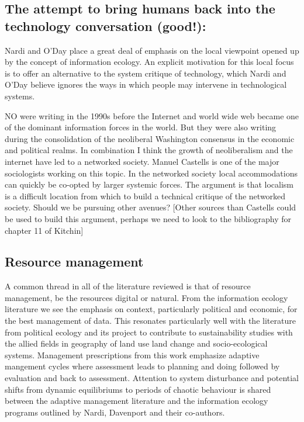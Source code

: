 \subsection{The attempt to bring humans back into the technology conversation (good!):}

Nardi and O'Day place a great deal of emphasis on the local viewpoint opened up by the concept of information ecology. An explicit motivation for this local focus is to offer an alternative to the system critique of technology, which Nardi and O'Day believe ignores the ways in which people may intervene in technological systems.

NO were writing in the 1990s before the Internet and world wide web became one of the dominant information forces in the world. But they were also writing during the consolidation of the neoliberal Washington consensus in the economic and political realms. In combination I think the growth of neoliberalism and the internet have led to a networked society. Manuel Castells is one of the major sociologists working on this topic. In the networked society local accommodations can quickly be co-opted by larger systemic forces. The argument is that localism is a difficult location from which to build a technical critique of the networked society. Should we be pursuing other avenues? [Other sources than Castells could be used to build this argument, perhaps we need to look to the bibliography for chapter 11 of Kitchin]

\subsection{Resource management}

A common thread in all of the literature reviewed is that of resource management, be the resources digital or natural. From the information ecology literature we see the emphasis on context, particularly political and economic, for the best management of data. This resonates particularly well with the literature from political ecology and its project to contribute to sustainability studies with the allied fields in geography of land use land change and socio-ecological systems. Management prescriptions from this work emphasize adaptive mangement cycles where assessment leads to planning and doing followed by evaluation and back to assessment. Attention to system disturbance and potential shifts from dynamic equilibriums to periods of chaotic behaviour is shared between the adaptive management literature and the information ecology programs outlined by Nardi, Davenport and their co-authors. 

